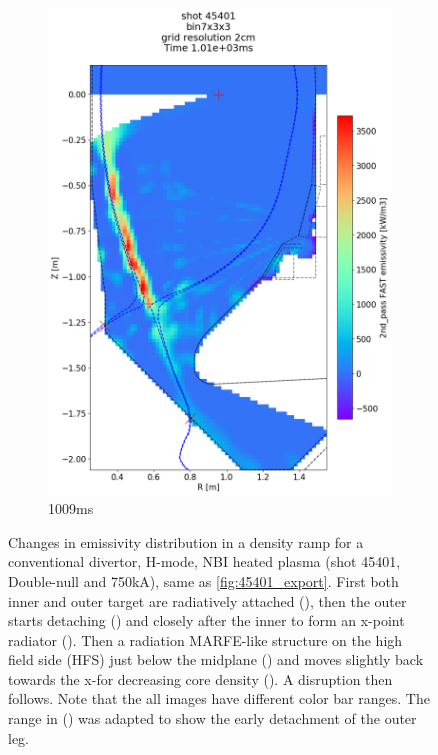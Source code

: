 \begin{figure}
\begin{subfigure}{0.395\linewidth}
         \includegraphics[trim={75 90 0 190},clip,width=\textwidth]{Chapters/chapter2/figs/IRVB-MASTU_shot-45401_export_90.png}
         \vspace*{-6.5mm}
         \caption{1009ms}
         \label{fig:45401_export2_5}
     \end{subfigure}
    \vspace*{-3mm}
    \caption{Changes in emissivity distribution in a density ramp for a conventional divertor, H-mode, NBI heated plasma (shot 45401, Double-null and 750kA), same as \autoref{fig:45401_export}. First both inner and outer target are radiatively attached (), then the outer starts detaching () and closely after the inner to form an x-point radiator (). Then a radiation MARFE-like structure on the high field side (HFS) just below the midplane () and moves slightly back towards the x-for decreasing core density (). A disruption then follows. Note that the all images have different color bar ranges. The range in () was adapted to show the early detachment of the outer leg.}
    \label{fig:45401_export2}
\end{figure}

